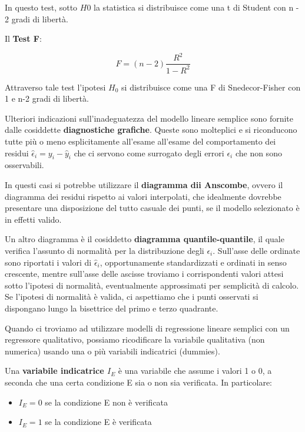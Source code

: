 \documentclass[a4paper]{extarticle}
\begin{document}
In questo test, sotto $H0$ la statistica si distribuisce come una t di Student con n - 2 gradi di libertà.

Il \textbf{Test F}:

\begin{equation*}
F = (n-2) \dfrac{R^2}{1-R^2}
\end{equation*}

Attraverso tale test l'ipotesi $H_0$ si distribuisce come una F di Snedecor-Fisher con 1 e n-2 gradi di libertà.

Ulteriori indicazioni sull'inadeguatezza del modello lineare semplice sono fornite dalle cosiddette \textbf{diagnostiche grafiche}. Queste sono molteplici e si riconducono tutte più o meno esplicitamente all'esame all'esame del comportamento dei residui $\hat \epsilon_i = y_i -\hat y_i$  che ci servono come surrogato degli errori $\epsilon_i$ che non sono osservabili.

In questi casi si potrebbe utilizzare il \textbf{diagramma dii Anscombe}, ovvero il diagramma dei residui rispetto ai valori interpolati, che idealmente dovrebbe presentare una disposizione del tutto casuale dei punti, se il modello selezionato è in effetti valido.

Un altro diagramma è il cosiddetto \textbf{diagramma quantile-quantile}, il quale verifica l'assunto di normalità per la distribuzione degli $\epsilon_i$.  Sull'asse delle ordinate sono riportati i valori di $\hat \epsilon_i$, opportunamente standardizzati e ordinati in senso crescente, mentre sull'asse delle ascisse troviamo i corrispondenti valori attesi sotto l'ipotesi di normalità, eventualmente approssimati per semplicità di calcolo. Se l'ipotesi di normalità è valida, ci aspettiamo che i punti osservati si dispongano lungo la bisettrice del primo e terzo quadrante.

Quando ci troviamo ad utilizzare modelli di regressione lineare semplici con un regressore qualitativo, possiamo ricodificare la variabile qualitativa (non numerica) usando una o più variabili indicatrici (dummies). 

Una \textbf{variabile indicatrice $I_E$} è una variabile che assume i valori 1 o 0, a seconda che una certa condizione E sia o non sia verificata. In particolare:

\begin{itemize}
\item $I_E = 0$ se la condizione E non è verificata
\item $I_E = 1$ se la condizione E è verificata
\end{itemize}
\end{document}

